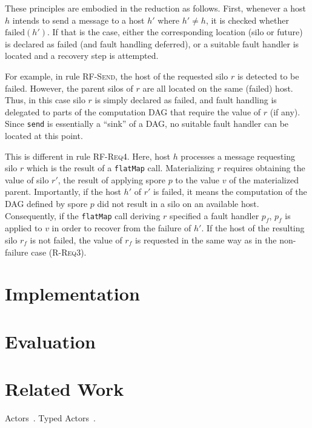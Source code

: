 \documentclass[preprint]{sigplanconf}
\theoremstyle{definition}
\theoremstyle{definition}
\begin{document}
These principles are embodied in the reduction as follows. First, whenever a
host $h$ intends to send a message to a host $h'$ where $h' \neq h$, it is
checked whether $\text{failed}(h')$. If that is the case, either the
corresponding location (silo or future) is declared as failed (and fault
handling deferred), or a suitable fault handler is located and a recovery step
is attempted.

For example, in rule \textsc{RF-Send}, the host of the requested silo $r$ is
detected to be failed. However, the parent silos of $r$ are all located on the
same (failed) host. Thus, in this case silo $r$ is simply declared as failed,
and fault handling is delegated to parts of the computation DAG that require
the value of $r$ (if any). Since \texttt{send} is essentially a ``sink'' of a
DAG, no suitable fault handler can be located at this point.

This is different in rule \textsc{RF-Req4}. Here, host $h$ processes a message
requesting silo $r$ which is the result of a \texttt{flatMap} call.
Materializing $r$ requires obtaining the value of silo $r'$, the result of
applying spore $p$ to the value $v$ of the materialized parent. Importantly,
if the host $h'$ of $r'$ is failed, it means the computation of the DAG
defined by spore $p$ did not result in a silo on an available host.
Consequently, if the \texttt{flatMap} call deriving $r$ specified a fault
handler $p_f$, $p_f$ is applied to $v$ in order to recover from the failure of
$h'$. If the host of the resulting silo $r_f$ is not failed, the value of
$r_f$ is requested in the same way as in the non-failure case
(\textsc{R-Req3}).



\section{Implementation}
\label{sec:implementation}

\section{Evaluation}
\label{sec:evaluation}

\section{Related Work}
\label{sec:related-work}

Actors~\cite{Actors, ScalaActors}. Typed Actors~\cite{TypedActors}.
\end{document}
